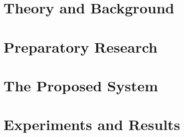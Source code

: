 \documentclass[b5paper, twoside, openright, titlepage, 10pt]{report}
\begin{document}
\chapter{Theory and Background}
\label{backgroundAndMotivation}

%



%

\chapter{Preparatory Research}
\label{relatedWork}
%




\chapter{The Proposed System}
\label{theModel}




%









%

\chapter{Experiments and Results}
\label{experimentsAndResults}

%
%
%
%


\end{document}
